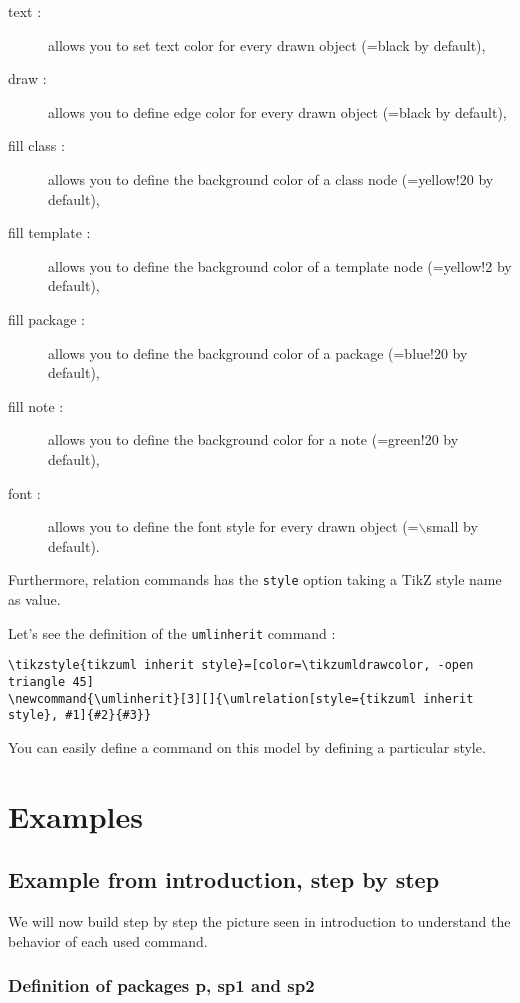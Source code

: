 \documentclass[a4paper,11pt]{report}
\newcommand{\TikZ}{{\sc TikZ} \xspace}
\begin{document}
\begin{description}
\item[text : ] allows you to set text color for every drawn object (=black by default),
\item[draw :] allows you to define edge color for every drawn object (=black by default),
\item[fill class :] allows you to define the background color of a class node (=yellow!20 by default),
\item[fill template :] allows you to define the background color of a template node (=yellow!2 by default),
\item[fill package :] allows you to define the background color of a package (=blue!20 by default),
\item[fill note :] allows you to define the background color for a note (=green!20 by default),
\item[font :] allows you to define the font style for every drawn object (=$\backslash$small by default).
\end{description}

Furthermore, relation commands has the {\tt style} option taking a \TikZ style name as value.

Let's see the definition of the {\tt umlinherit} command :

\begin{lstlisting}
\tikzstyle{tikzuml inherit style}=[color=\tikzumldrawcolor, -open triangle 45]
\newcommand{\umlinherit}[3][]{\umlrelation[style={tikzuml inherit style}, #1]{#2}{#3}}
\end{lstlisting}

You can easily define a command on this model by defining a particular style.

\section{Examples}

\subsection{Example from introduction, step by step}

We will now build step by step the picture seen in introduction to understand the behavior of each used command.

\subsubsection{Definition of packages p, sp1 and sp2}
\end{document}
